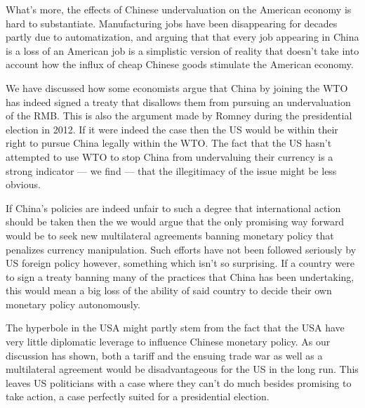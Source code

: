 What's more, the effects of Chinese undervaluation on the American 
economy is hard to substantiate.  Manufacturing jobs have been 
disappearing for decades partly due to automatization, and arguing that 
that every job appearing in China is a loss of an American job is a 
simplistic version of reality that doesn't take into account how the 
influx of cheap Chinese goods stimulate the American economy.

We have discussed how some economists argue that China by joining the 
WTO has indeed signed a treaty that disallows them from pursuing an 
undervaluation of the RMB. This is also the argument made by Romney 
during the presidential election in 2012. If it were indeed the case 
then the US would be within their right to pursue China legally within 
the WTO. The fact that the US hasn't attempted to use WTO to stop China 
from undervaluing their currency is a strong indicator --- we find --- 
that the illegitimacy of the issue might be less obvious.

If China's policies are indeed unfair to such a degree that 
international action should be taken then the we would argue that the 
only promising way forward would be to seek new multilateral agreements 
banning monetary policy that penalizes currency manipulation. Such 
efforts have not been followed seriously by US foreign policy however, 
something which isn't so surprising. If a country were to sign a treaty 
banning many of the practices that China has been undertaking, this 
would mean a big loss of the ability of said country to decide their own 
monetary policy autonomously.

The hyperbole in the USA might partly stem from the fact that the USA 
have very little diplomatic leverage to influence Chinese monetary 
policy. As our discussion has shown, both a tariff and the ensuing trade 
war as well as a multilateral agreement would be disadvantageous for the 
US in the long run. This leaves US politicians with a case where they 
can't do much besides promising to take action, a case perfectly suited 
for a presidential election.
